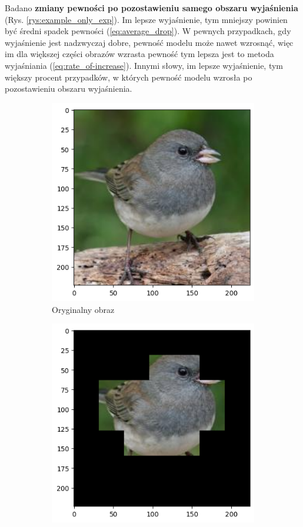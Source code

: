 Badano \textbf{zmiany pewności po pozostawieniu samego obszaru wyjaśnienia} (Rys. \ref{rys:example_only_exp}).
Im lepsze wyjaśnienie, tym mniejszy powinien być średni spadek pewności (\ref{eq:average_drop}).
W pewnych przypadkach, gdy wyjaśnienie jest nadzwyczaj dobre, pewność modelu może nawet wzrosnąć, więc im dla większej części obrazów wzrasta pewność tym lepsza jest to metoda wyjaśniania (\ref{eq:rate_of-increase}).
Innymi słowy, im lepsze wyjaśnienie, tym większy procent przypadków, w których pewność modelu wzrosła po pozostawieniu obszaru wyjaśnienia.

\begin{figure}[h]
	\begin{subfigure}[b]{0.45\textwidth}
		\centering\includegraphics[width=.9\textwidth]{img/parameters/quality/base}
		\caption{Oryginalny obraz}
	\end{subfigure}
	\begin{subfigure}[b]{0.45\textwidth}
		\centering\includegraphics[width=.9\textwidth]{img/parameters/quality/mask}

\end{subfigure}
\end{figure}
